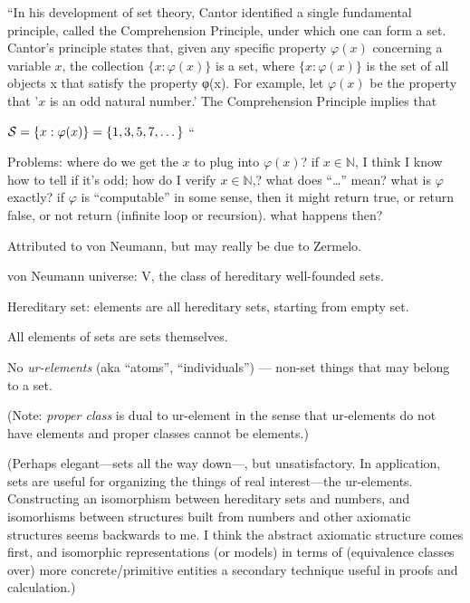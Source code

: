``In his development of set theory, 
Cantor identified a single fundamental principle, 
called the Comprehension Principle, 
under which one can form a set.
Cantor’s principle states that, 
given any specific property $\varphi(x)$ 
concerning a variable $x$, 
the collection $\{x:\varphi(x)\}$ is a set, 
where $\{x:\varphi(x)\}$ is 
the set of all objects x that satisfy the property φ(x).
For example, let $\varphi(x)$ be the property that 
'$x$ is an odd natural number.' 
The Comprehension Principle implies that

$\mathcal{S}=\{x:\varphi(x)\}=\{1,3,5,7,\dots\}$ ``\cite{iep:SetTheory}

Problems: \hfill\break
where do we get the $x$ to plug into $\varphi(x)$?\hfill\break
if $x\in\mathbb{N}$, I think I know how to tell if it's odd;
how do I verify $x\in\mathbb{N}$,?\hfill\break
what does ``\dots'' mean?\hfill\break
what is $\varphi$ exactly?\hfill\break
if $\varphi$ is ``computable'' in some sense,
then it might return true, or return false, or not return
(infinite loop or recursion). what happens then?

\label{sec:von_Neumann_universe}

Attributed to von Neumann, but may really be due to
Zermelo\cite{Zermelo:1930:SetTheory}.

von Neumann universe: \textsf{V}\cite{wiki:VonNeumannUniverse},
the class of hereditary well-founded sets.

Hereditary set: elements are all hereditary sets, 
starting from empty set\cite{wiki:Hereditary-set}.

All elements of sets are sets themselves.

No \textsl{ur-elements}\cite{wiki:Urelement} 
(aka ``atoms'', ``individuals'') ---
non-set things that may belong to a set.

(Note: \textsl{proper class} is dual to ur-element in the sense that
ur-elements do not have elements and proper classes cannot be 
elements.)

(Perhaps elegant---sets all the way down---, but unsatisfactory. 
In application, sets are useful for organizing the things
of real interest---the ur-elements.
Constructing an isomorphism between hereditary sets
and numbers, and isomorhisms between structures built
from numbers and other axiomatic structures seems
backwards to me.
I think the abstract axiomatic structure comes first, 
and isomorphic representations (or models) in terms of 
(equivalence classes over) more concrete/primitive
entities a secondary technique useful in proofs and calculation.)

